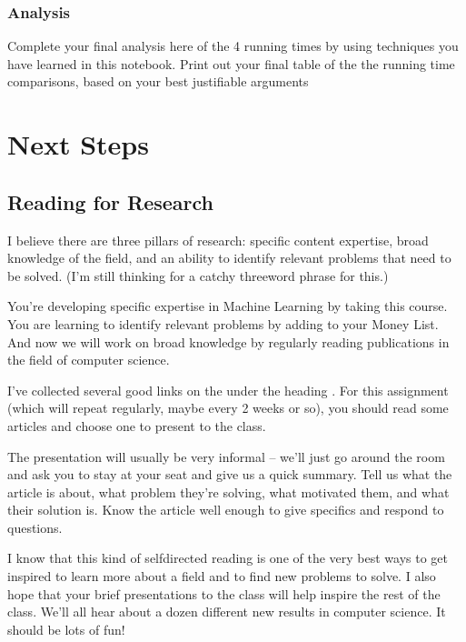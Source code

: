 \documentclass[letterpaper,10pt,english]{jupyterBook}
\begin{document}
\section{Analysis}
\label{\detokenize{lessons/Running_Time_Analysis:analysis}}
\sphinxAtStartPar
Complete your final analysis here of the 4 running times by using techniques you have learned in this notebook. Print out your final table of the the running time comparisons, based on your best justifiable arguments

\sphinxstepscope


\part{Next Steps}

\sphinxstepscope


\chapter{Reading for Research}
\label{\detokenize{lessons/reading:reading-for-research}}\label{\detokenize{lessons/reading::doc}}
\sphinxAtStartPar
I believe there are three pillars of research: specific content expertise, broad knowledge of the field, and an ability to identify relevant problems that need to be solved. (I’m still thinking
for a catchy three\sphinxhyphen{}word phrase for this.)

\sphinxAtStartPar
You’re developing specific expertise in Machine Learning by taking this course. You
are learning to identify relevant problems by adding to your Money List. And now we
will work on broad knowledge by regularly reading publications in the field of
computer science.

\sphinxAtStartPar
I’ve collected several good links on the  under the heading . For this assignment (which will repeat regularly, maybe every 2 weeks or so), you should read some articles and choose one to present to the class.

\sphinxAtStartPar
The presentation will usually be very informal – we’ll just go around the room and ask you to stay at your seat and give us a quick summary. Tell us what the article is about, what problem they’re solving, what motivated them, and what their solution is. Know the article well enough to
give specifics and respond to questions.

\sphinxAtStartPar
I know that this kind of self\sphinxhyphen{}directed reading is one of the very best ways to get inspired
to learn more about a field and to find new problems to solve. I also hope that your brief presentations to the class will help inspire the rest of the class. We’ll all hear about
a dozen different new results in computer science. It should be lots of fun!
\end{document}
